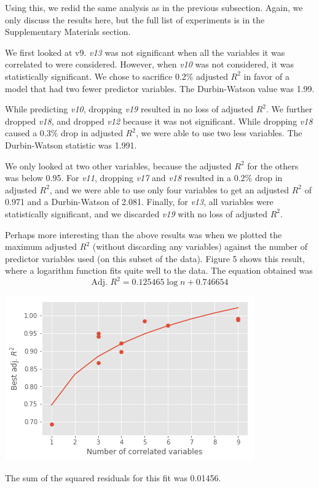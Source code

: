 \documentclass[12pt,a4paper,twocolumn]{article}
\begin{document}
Using this, we redid the same analysis as in the previous subsection. Again, we only discuss the results here, but the full list of experiments is in the Supplementary Materials section.

We first looked at v9. \textit{v13} was not significant when all the variables it was correlated to were considered. However, when \textit{v10} was not considered, it was statistically significant. We chose to sacrifice 0.2\% adjusted $R^2$ in favor of a model that had two fewer predictor variables. The Durbin-Watson value was 1.99.

While predicting \textit{v10}, dropping \textit{v19} resulted in no loss of adjusted $R^2$. We further dropped \textit{v18}, and dropped \textit{v12} because it was not significant. While dropping \textit{v18} caused a 0.3\% drop in adjusted $R^2$, we were able to use two less variables. The Durbin-Watson statistic was 1.991.

We only looked at two other variables, because the adjusted $R^2$ for the others was below 0.95. For \textit{v11}, dropping \textit{v17} and \textit{v18} resulted in a 0.2\% drop in adjusted $R^2$, and we were able to use only four variables to get an adjusted $R^2$ of 0.971 and a Durbin-Watson of 2.081. Finally, for \textit{v13}, all variables were statistically significant, and we discarded \textit{v19} with no loss of adjusted $R^2$.

Perhaps more interesting than the above results was when we plotted the maximum adjusted $R^2$ (without discarding any variables) against the number of predictor variables used (on this subset of the data). Figure 5 shows this result, where a logarithm function fits quite well to the data. The equation obtained was
\begin{equation}
	\text{Adj. } R^2 = 0.125465 \log n + 0.746654
\end{equation}

\includegraphics[scale=0.5]{fig5.png}
\begingroup
{}
\endgroup
\hfill\break

The sum of the squared residuals for this fit was 0.01456.



\end{document}
